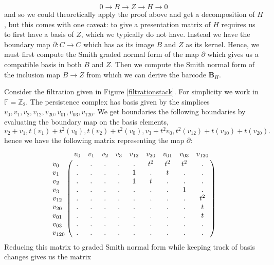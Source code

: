 \[
  0 \to B \to Z \to H \to 0
\]
and so we could theoretically apply the proof above and get a decomposition of $H$, but this comes with one caveat: to give a presentation matrix of $H$ requires us to first have a basis of $Z$, which we typically do not have. Instead we have the boundary map $\partial: C \to C$ which has as its image $B$ and $Z$ as its kernel. Hence, we must first compute the Smith graded normal form of the map $\partial$ which gives us a compatible basis in both $B$ and $Z$. Then we compute the Smith normal form of the inclusion map $B \to Z$ from which we can derive the barcode $\mathbf{B}_{H}$.

\begin{example}\label{bddreduce}
Consider the filtration given in Figure \ref{filtrationstack}. For simplicity we work in $\mathbb{F}=\mathbb{Z}_{2}$. The persistence complex has basis given by the simplices $v_{0},v_{1},v_{2},v_{12},v_{20},v_{01},v_{03},v_{120}$. We get boundaries the following boundaries by evaluating the boundary map on the basis elements, \[v_{2}+v_{1},t(v_{1})+t^{2}(v_{0}),t(v_{2})+t^{2}(v_{0}),v_{3}+t^{2}v_{0}, t^{2}(v_{12})+t(v_{10})+t(v_{20}).\]
hence we have the following matrix representing the map $\partial$:
\[
  \bordermatrix{
    & v_{0} & v_{1} & v_{2} & v_{3} & v_{12} & v_{20} & v_{01} & v_{03} & v_{120}\cr
    v_{0}  &.&.&.&.&.&t^{2}&t^{2}&t^{2}&.\cr
    v_{1}  &.&.&.&.&1&.&t&.&.\cr
    v_{2}  &.&.&.&.&1&t&.&.&.\cr
    v_{3}  &.&.&.&.&.&.&.&1&.\cr
    v_{12} &.&.&.&.&.&.&.&.&t^{2}\cr
    v_{20} &.&.&.&.&.&.&.&.&t\cr
    v_{01} &.&.&.&.&.&.&.&.&t\cr
    v_{03} &.&.&.&.&.&.&.&.&.\cr
    v_{120}&.&.&.&.&.&.&.&.&.
    }
  \]
  Reducing this matrix to graded Smith normal form while keeping track of basis changes gives us the matrix



\end{example}

